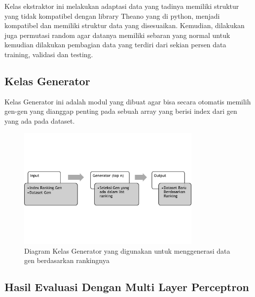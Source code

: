 Kelas ekstraktor ini melakukan adaptasi data yang tadinya memiliki struktur yang tidak kompatibel dengan library Theano yang di python, menjadi kompatibel dan memiliki struktur data yang disesuaikan. Kemudian, dilakukan juga permutasi random agar datanya memiliki sebaran yang normal untuk kemudian dilakukan pembagian data yang terdiri dari sekian persen data training, validasi dan testing.

\subsection{Kelas Generator}
Kelas Generator ini adalah modul yang dibuat agar bisa secara otomatis memilih gen-gen yang dianggap penting pada sebuah array yang berisi index dari gen yang ada pada dataset.
\begin{figure}
	\centering
	\includegraphics[width=0.8\textwidth]
		{pics/generator.png}
	\caption{Diagram Kelas Generator yang digunakan untuk menggenerasi data gen berdasarkan rankingnya}
	\label{fig:generator}
\end{figure}


\subsection{Hasil Evaluasi Dengan Multi Layer Perceptron}

